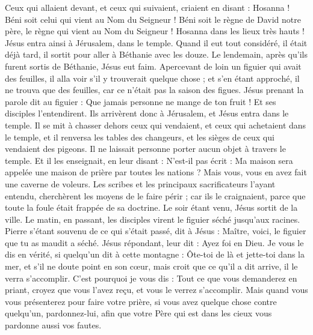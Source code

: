 \begin{multicols}{2}
Ceux qui allaient devant, et ceux qui suivaient, criaient en disant : Hosanna ! Béni soit celui qui vient au Nom du Seigneur !
Béni soit le règne de David notre père, le règne qui vient au Nom du Seigneur ! Hosanna dans les lieux très hauts !
Jésus entra ainsi à Jérusalem, dans le temple. Quand il eut tout considéré, il était déjà tard, il sortit pour aller à Béthanie avec les douze.
Le lendemain, après qu’ils furent sortis de Béthanie, Jésus eut faim.
Apercevant de loin un figuier qui avait des feuilles, il alla voir s'il y trouverait quelque chose ; et s’en étant approché, il ne trouva que des feuilles, car ce n'était pas la saison des figues.
Jésus prenant la parole dit au figuier : Que jamais personne ne mange de ton fruit ! Et ses disciples l'entendirent.
Ils arrivèrent donc à Jérusalem, et Jésus entra dans le temple. Il se mit à chasser dehors ceux qui vendaient, et ceux qui achetaient dans le temple, et il renversa les tables des changeurs, et les sièges de ceux qui vendaient des pigeons.
Il ne laissait personne porter aucun objet à travers le temple.
Et il les enseignait, en leur disant : N'est-il pas écrit : Ma maison sera appelée une maison de prière par toutes les nations ? Mais vous, vous en avez fait une caverne de voleurs{}.
Les scribes et les principaux sacrificateurs l’ayant entendu, cherchèrent les moyens de le faire périr ; car ils le craignaient, parce que toute la foule était frappée de sa doctrine.
Le soir étant venu, Jésus sortit de la ville.
Le matin, en passant, les disciples virent le figuier séché jusqu’aux racines.
Pierre s'étant souvenu de ce qui s'était passé, dit à Jésus : Maître, voici, le figuier que tu as maudit a séché.
Jésus répondant, leur dit : Ayez foi en Dieu.
Je vous le dis en vérité, si quelqu’un dit à cette montagne : Ôte-toi de là et jette-toi dans la mer, et s’il ne doute point en son cœur, mais croit que ce qu’il a dit arrive, il le verra s’accomplir.
C'est pourquoi je vous dis : Tout ce que vous demanderez en priant, croyez que vous l’avez reçu, et vous le verrez s’accomplir.
Mais quand vous vous présenterez pour faire votre prière, si vous avez quelque chose contre quelqu'un, pardonnez-lui, afin que votre Père qui est dans les cieux vous pardonne aussi vos fautes.

\end{multicols}
